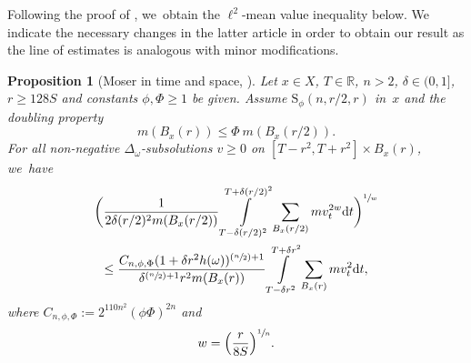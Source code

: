 \documentclass[10pt]{amsart}
\newcommand{\Psfrac}[2]{(\sfrac{#1}{#2})}
\newcommand{\rS}{\mathrm{S}}
\theoremstyle{plain}
\newtheorem{proposition}[theorem]{Proposition}
\theoremstyle{definition}
\newcommand{\RR}{\mathbb{R}}
\newcommand{\drm}{\mathrm{d}}
\let\oldint\int
\renewcommand{\int}{\oldint\limits}
\begin{document}
Following the proof of {\cite[Th.\,2.7]{KellerRose-22a}}, we~obtain the $\ell^2$-mean value inequality {below}. We indicate the necessary changes in the latter article in order to obtain our result as the line of estimates is analogous with minor modifications.
\begin{proposition}[Moser in time and space, ]\label{thm:KR22-subsolution}
Let $ x\in X $, $T\in\RR$,
$n>2$, $\delta\in(0,1]$, $r\geq 128 S$ and constants $\phi,\Phi\geq 1$ be given.
Assume $\rS_{\phi}(n,r/2,r)$ in~$ x$ and the doubling property
\[
m(B_x(r))\leq \Phi\ m(B_x(r/2)).
\]
For all non-negative $\Delta_\omega$-subsolutions $v\geq 0$ on $[T-r^2,T+r^2]\times B_{x}(r)$, we~have
\begin{multline*}
\biggl(\frac{1}{2 \delta (r/2)^2m({B_{x}(r/2)})}\int\limits_{T-\delta (r/2)^2}^{T+\delta (r/2)^2}\sum_{B_{x}(r/2)} mv_t^{2w}\drm t\biggr)^{\sfrac{1}{w}}
\\
\leq
\frac{C_{n,\phi,\Phi}(1+\delta r^2h(\omega))^{\Psfrac{n}{2}+1} }{\delta^{\Psfrac{n}{2}+1} r^{2}m({B_{x}(r)})}
\int\limits_{T- \delta r^2}^{T+\delta r^2}\sum_{B_{x}(r)} mv_t^{2}\drm t,
\end{multline*}
where $C_{n,\phi,\Phi}:=2^{{110}n^2}(\phi\Phi)^{2n}$
and
\[
w=\Bigl(\frac{r}{8S}\Bigr)^{\sfrac{1}{n}}.
\]
\end{proposition}
\end{document}
